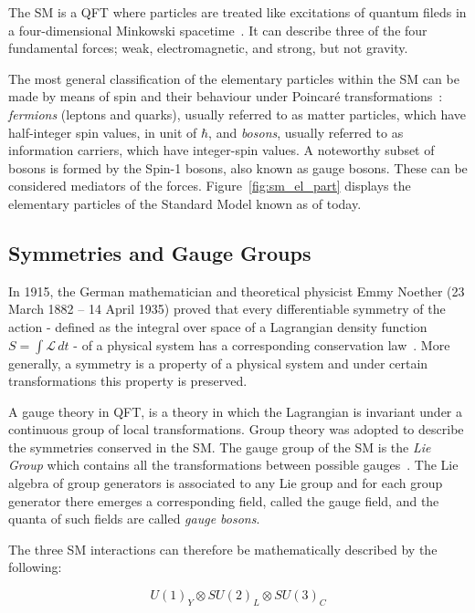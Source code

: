 		The \ac{SM} is a \ac{QFT} where particles are treated like excitations of quantum fileds in a four-dimensional Minkowski spacetime~\cite{Peskin1995}. It can describe three of the four fundamental forces; weak, electromagnetic, and strong, but not gravity.

		The most general classification of the elementary particles within the \ac{SM} can be made by means of spin and their behaviour under Poincaré transformations~\cite{Cottingham1998}: \textit{fermions} (leptons and quarks), usually referred to as matter particles, which have half-integer spin values, in unit of $\hbar$, and \textit{bosons}, usually referred to as information carriers, which have integer-spin values. A noteworthy subset of bosons is formed by the Spin-1 bosons, also known as gauge bosons. These can be considered mediators of the forces. Figure~\ref{fig:sm_el_part} displays the elementary particles of the Standard Model known as of today.



		\subsection*{Symmetries and Gauge Groups}

			In 1915, the German mathematician and theoretical physicist Emmy Noether (23 March 1882 – 14 April 1935) proved that every differentiable symmetry of the action - defined as the integral over space of a Lagrangian density function $S = \int \mathcal{L}\, dt$ - of a physical system has a corresponding conservation law~\cite{lederman2004symmetry}. More generally, a symmetry is a property of a physical system and under certain transformations this property is preserved. 

			A gauge theory in \ac{QFT}, is a theory in which the Lagrangian is invariant under a continuous group of local transformations. Group theory was adopted to describe the symmetries conserved in the \ac{SM}. The gauge group of the \ac{SM} is the \emph{Lie Group} which contains all the transformations between possible gauges~\cite{Cottingham1998}. The Lie algebra of group generators is associated to any Lie group and for each group generator there emerges a corresponding field, called the gauge field, and the quanta of such fields are called \emph{gauge bosons}.
			
			The three \ac{SM} interactions can therefore be mathematically described by the following:

			\begin{equation}
			\label{eq:SM_gaugeSym}
				U(1)_Y \otimes SU(2)_L \otimes SU(3)_C
			\end{equation}


